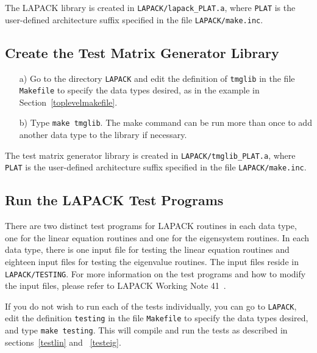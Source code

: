 \documentclass[11pt]{report}
\begin{document}
\noindent
The LAPACK library is created in \texttt{LAPACK/lapack\_PLAT.a}, where
\texttt{PLAT} is the user-defined architecture suffix specified in the file
\texttt{LAPACK/make.inc}.

\subsection{Create the Test Matrix Generator Library}

\begin{itemize}
\item[a)]
Go to the directory \texttt{LAPACK} and edit the definition of \texttt{tmglib}
in the file \texttt{Makefile} to specify the data types desired, as in the
example in Section~\ref{toplevelmakefile}.

\item[b)]
Type \texttt{make tmglib}.
The make command can be run more than once to add another
data type to the library if necessary.  

\end{itemize}

\noindent
The test matrix generator library is created in \texttt{LAPACK/tmglib\_PLAT.a},
where \texttt{PLAT} is the user-defined architecture suffix specified in the 
file \texttt{LAPACK/make.inc}.

\subsection{Run the LAPACK Test Programs}

There are two distinct test programs for LAPACK routines
in each data type, one for the linear equation routines and
one for the eigensystem routines.
In each data type, there is one input file for testing the linear
equation routines and eighteen input files for testing the eigenvalue
routines.
The input files reside in \texttt{LAPACK/TESTING}.
For more information on the test programs and how to modify the
input files, please refer to LAPACK Working Note 41~\cite{WN41}.

If you do not wish to run each of the tests individually, you can
go to \texttt{LAPACK}, edit the definition \texttt{testing} in the file
\texttt{Makefile} to specify the data types desired, and type \texttt{make
testing}.  This will
compile and run the tests as described in sections~\ref{testlin} 
and ~\ref{testeig}.

 
\end{document}
